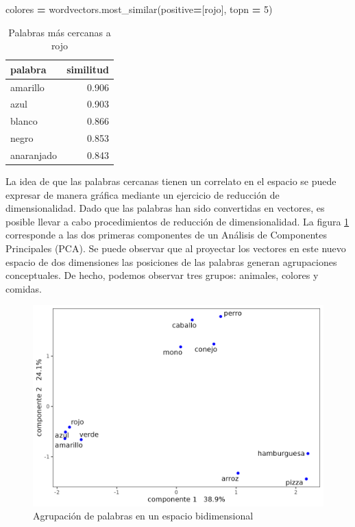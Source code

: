 \documentclass[
  12pt,
]{article}
\newenvironment{Shaded}{\begin{snugshade}}{\end{snugshade}}
\newcommand{\DecValTok}[1]{\textcolor[rgb]{0.00,0.00,0.81}{#1}}
\newcommand{\NormalTok}[1]{#1}
\newcommand{\OperatorTok}[1]{\textcolor[rgb]{0.81,0.36,0.00}{\textbf{#1}}}
\newcommand{\StringTok}[1]{\textcolor[rgb]{0.31,0.60,0.02}{#1}}
\begin{document}
\begin{Shaded}
\begin{Highlighting}[]
\NormalTok{colores }\OperatorTok{=}\NormalTok{  wordvectors.most\_similar(positive}\OperatorTok{=}\NormalTok{[}\StringTok{\textquotesingle{}rojo\textquotesingle{}}\NormalTok{],  topn }\OperatorTok{=} \DecValTok{5}\NormalTok{)}
\end{Highlighting}
\end{Shaded}

\begin{table}[H]

\caption{\label{tab:tabla_colores}Palabras más cercanas a rojo}
\centering
\begin{tabular}[t]{lr}
\toprule
palabra & similitud\\
\midrule
amarillo & 0.906\\
azul & 0.903\\
blanco & 0.866\\
negro & 0.853\\
anaranjado & 0.843\\
\bottomrule
\end{tabular}
\end{table}

La idea de que las palabras cercanas tienen un correlato en el espacio
se puede expresar de manera gráfica mediante un ejercicio de reducción
de dimensionalidad. Dado que las palabras han sido convertidas en
vectores, es posible llevar a cabo procedimientos de reducción de
dimensionalidad. La figura \ref{plot_pca_ejemplo} corresponde a las dos
primeras componentes de un Análisis de Componentes Principales (PCA). Se
puede observar que al proyectar los vectores en este nuevo espacio de
dos dimensiones las posiciones de las palabras generan agrupaciones
conceptuales. De hecho, podemos observar tres grupos: animales, colores
y comidas.

\begin{figure}[H]
\centering
\large
\caption{Agrupación de palabras en un espacio bidimensional}
\label{plot_pca_ejemplo}
\includegraphics[width = 0.5 \textwidth]{cuadros_tesis/plot_pca.png}
\normalsize
\end{figure}
\end{document}
